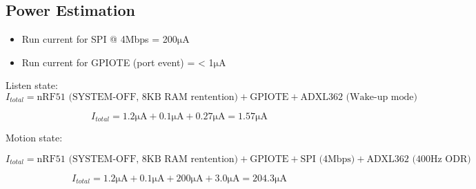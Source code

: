 \subsection{Power Estimation}

\begin{itemize}
\item Run current for SPI @ 4Mbps = 200$\si{\micro\ampere}$
\item Run current for GPIOTE (port event) = < 1$\si{\micro\ampere}$
\end{itemize}

Listen state:
\begin{equation}
I_{total} = \text{nRF51 (SYSTEM-OFF, 8KB RAM rentention)} + \text{GPIOTE} + \text{ADXL362 (Wake-up mode)}
\end{equation}

\begin{equation}
I_{total} = 1.2\si{\micro\ampere} + 0.1\si{\micro\ampere} + 0.27\si{\micro\ampere} = 1.57\si{\micro\ampere} 
\end{equation}

Motion state:

\begin{equation}
I_{total} = \text{nRF51 (SYSTEM-OFF, 8KB RAM rentention)} + \text{GPIOTE} + \text{SPI (4Mbps)} + \text{ADXL362 (400Hz ODR)}
\end{equation}

\begin{equation}
I_{total} = 1.2\si{\micro\ampere} + 0.1\si{\micro\ampere} + 200\si{\micro\ampere} + 3.0 \si{\micro\ampere} = 204.3\si{\micro\ampere} 
\end{equation}